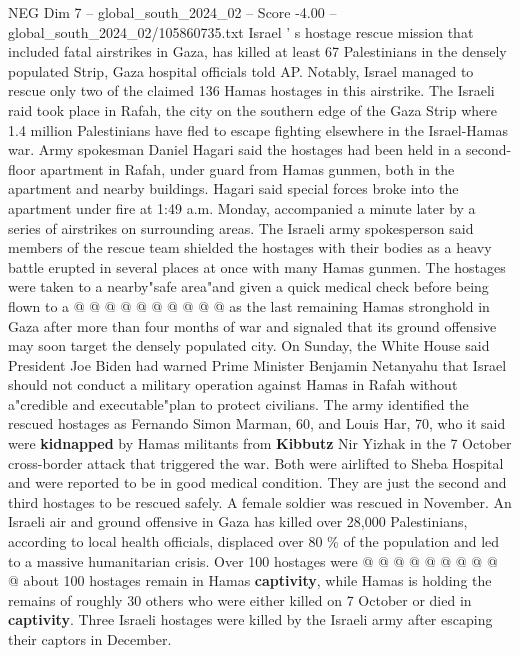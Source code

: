 \begin{textsample}{NEG Dim 7 – global\_south\_2024\_02 – Score -4.00 – global\_south\_2024\_02/105860735.txt}  \label{ex:f7_neg_400}
Israel ' s hostage rescue mission that included fatal airstrikes in Gaza, has killed at least 67 Palestinians in the densely populated Strip, Gaza hospital officials told AP.
Notably, Israel managed to rescue only two of the claimed 136 Hamas hostages in this airstrike.
The Israeli raid took place in Rafah, the city on the southern edge of the Gaza Strip where 1.4 million Palestinians have fled to escape fighting elsewhere in the Israel-Hamas war.
Army spokesman Daniel Hagari said the hostages had been held in a second-floor apartment in Rafah, under guard from Hamas gunmen, both in the apartment and nearby buildings.
Hagari said special forces broke into the apartment under fire at 1:49 a.m.
Monday, accompanied a minute later by a series of airstrikes on surrounding areas.
The Israeli army spokesperson said members of the rescue team shielded the hostages with their bodies as a heavy battle erupted in several places at once with many Hamas gunmen.
The hostages were taken to a nearby"safe area"and given a quick medical check before being flown to a @ @ @ @ @ @ @ @ @ @ as the last remaining Hamas stronghold in Gaza after more than four months of war and signaled that its ground offensive may soon target the densely populated city.
On Sunday, the White House said President Joe Biden had warned Prime Minister Benjamin Netanyahu that Israel should not conduct a military operation against Hamas in Rafah without a"credible and executable"plan to protect civilians.
The army identified the rescued hostages as Fernando Simon Marman, 60, and Louis Har, 70, who it said were \textbf{kidnapped} by Hamas militants from \textbf{Kibbutz} Nir Yizhak in the 7 October cross-border attack that triggered the war.
Both were airlifted to Sheba Hospital and were reported to be in good medical condition.
They are just the second and third hostages to be rescued safely.
A female soldier was rescued in November.
An Israeli air and ground offensive in Gaza has killed over 28,000 Palestinians, according to local health officials, displaced over 80 \% of the population and led to a massive humanitarian crisis.
Over 100 hostages were @ @ @ @ @ @ @ @ @ @ about 100 hostages remain in Hamas \textbf{captivity}, while Hamas is holding the remains of roughly 30 others who were either killed on 7 October or died in \textbf{captivity}.
Three Israeli hostages were killed by the Israeli army after escaping their captors in December.

\end{textsample}
